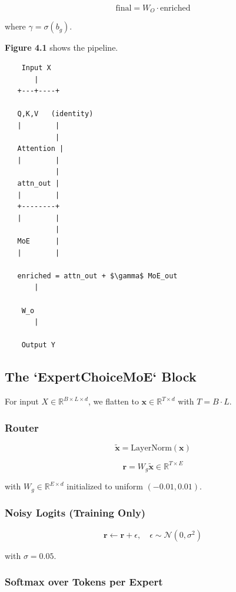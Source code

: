 \[
\text{final} = W_O \cdot \text{enriched}
\tag{4.4}
\]

where $\gamma = \sigma(b_g)$.

\textbf{Figure 4.1} shows the pipeline.

\begin{lstlisting}
    Input X
       |
   +---+----+
             
   Q,K,V   (identity)
   |        |
            |
   Attention |
   |        |
            |
   attn_out |
   |        |
   +--------+
   |        |
            |
   MoE      |
   |        |
             
   enriched = attn_out + $\gamma$ MoE_out
       |
        
    W_o
       |
        
    Output Y
\end{lstlisting}

\subsection{The `ExpertChoiceMoE` Block}

For input $X \in \mathbb{R}^{B \times L \times d}$, we flatten to 
$\mathbf{x} \in \mathbb{R}^{T \times d}$ with $T = B \cdot L$.

\subsubsection{Router}

\[
\tilde{\mathbf{x}} = \text{LayerNorm}(\mathbf{x})
\tag{4.5}
\]

\[
\mathbf{r} = W_g \tilde{\mathbf{x}} \in \mathbb{R}^{T \times E}
\tag{4.6}
\]

with $W_g \in \mathbb{R}^{E \times d}$ initialized to uniform $(-0.01, 0.01)$.

\subsubsection{Noisy Logits (Training Only)}

\[
\mathbf{r} \leftarrow \mathbf{r} + \epsilon, \quad \epsilon \sim \mathcal{N}(0, \sigma^2)
\tag{4.7}
\]

with $\sigma = 0.05$.

\subsubsection{Softmax over Tokens per Expert}

